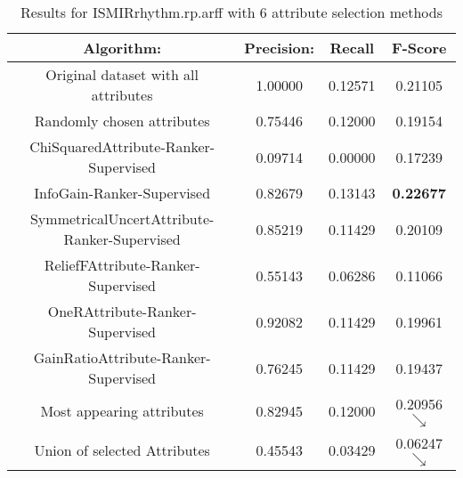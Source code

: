 \begin{table}[p]
\begin{center}
\begin{tabular}{|c|c|c|c|}
\hline Algorithm: & Precision: & Recall & F-Score\\
\hline Original dataset with all attributes  & 1.00000   &  0.12571  &
 0.21105\\
\hline Randomly chosen attributes & 0.75446 & 0.12000 & 0.19154\\
\hline ChiSquaredAttribute-Ranker-Supervised & 0.09714 & 0.00000 & 0.17239\\
\hline InfoGain-Ranker-Supervised & 0.82679 & 0.13143 & {\bf 0.22677}\\
\hline SymmetricalUncertAttribute-Ranker-Supervised & 0.85219 & 0.11429 &
0.20109\\
\hline ReliefFAttribute-Ranker-Supervised & 0.55143 & 0.06286 & 0.11066\\
\hline OneRAttribute-Ranker-Supervised & 0.92082 & 0.11429 & 0.19961\\
\hline GainRatioAttribute-Ranker-Supervised & 0.76245 & 0.11429 & 0.19437\\
\hline Most appearing attributes & 0.82945 & 0.12000 & 0.20956 $\searrow$\\
\hline Union of selected Attributes & 0.45543 & 0.03429 & 0.06247 $\searrow$\\

\hline
\end{tabular}
\caption{Results for ISMIRrhythm.rp.arff with 6 attribute selection methods}
\label{table:classifier:ISMIRrhythm6}
\end{center}
\end{table}



